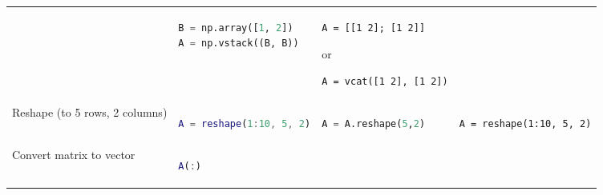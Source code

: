 \documentclass[10pt, landscape]{article}
\begin{document}
\begin{multicols}{2}
\begin{tabular}[]{@{}llll@{}}
\begin{minipage}[t]{0.23\columnwidth}
\end{minipage} & \begin{minipage}[t]{0.20\columnwidth}\raggedright
\begin{lstlisting}[language=Python]
B = np.array([1, 2])
A = np.vstack((B, B))
\end{lstlisting}

\end{minipage} & \begin{minipage}[t]{0.20\columnwidth}\raggedright
\begin{lstlisting}
A = [[1 2]; [1 2]]
\end{lstlisting}

or

\begin{lstlisting}
A = vcat([1 2], [1 2])
\end{lstlisting}

\end{minipage}\tabularnewline
\begin{minipage}[t]{0.24\columnwidth}\raggedright
Reshape (to 5 rows, 2 columns)
\end{minipage} & \begin{minipage}[t]{0.23\columnwidth}\raggedright
\begin{lstlisting}[language=Matlab]
A = reshape(1:10, 5, 2)
\end{lstlisting}

\end{minipage} & \begin{minipage}[t]{0.20\columnwidth}\raggedright
\begin{lstlisting}[language=Python]
A = A.reshape(5,2)
\end{lstlisting}

\end{minipage} & \begin{minipage}[t]{0.20\columnwidth}\raggedright
\begin{lstlisting}
A = reshape(1:10, 5, 2)
\end{lstlisting}

\end{minipage}\tabularnewline
\begin{minipage}[t]{0.24\columnwidth}\raggedright
Convert matrix to vector
\end{minipage} & \begin{minipage}[t]{0.23\columnwidth}\raggedright
\begin{lstlisting}[language=Matlab]
A(:)
\end{lstlisting}


\end{minipage}
\end{tabular}
\end{multicols}
\end{document}
